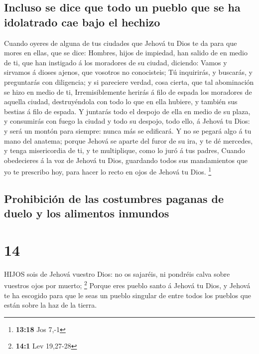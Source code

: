 \hypertarget{incluso-se-dice-que-todo-un-pueblo-que-se-ha-idolatrado-cae-bajo-el-hechizo}{%
\subsection{Incluso se dice que todo un pueblo que se ha idolatrado cae
bajo el
hechizo}\label{incluso-se-dice-que-todo-un-pueblo-que-se-ha-idolatrado-cae-bajo-el-hechizo}}

 Cuando oyeres de alguna de tus ciudades que Jehová tu Dios
te da para que mores en ellas, que se dice:  Hombres, hijos
de impiedad, han salido de en medio de ti, que han instigado á los
moradores de su ciudad, diciendo: Vamos y sirvamos á dioses ajenos, que
vosotros no conocisteis;  Tú inquirirás, y buscarás, y
preguntarás con diligencia; y si pareciere verdad, cosa cierta, que tal
abominación se hizo en medio de ti,  Irremisiblemente
herirás á filo de espada los moradores de aquella ciudad, destruyéndola
con todo lo que en ella hubiere, y también sus bestias á filo de espada.
 Y juntarás todo el despojo de ella en medio de su plaza, y
consumirás con fuego la ciudad y todo su despojo, todo ello, á Jehová tu
Dios: y será un montón para siempre: nunca más se edificará.
 Y no se pegará algo á tu mano del anatema; porque Jehová
se aparte del furor de su ira, y te dé mercedes, y tenga misericordia de
ti, y te multiplique, como lo juró á tus padres,  Cuando
obedecieres á la voz de Jehová tu Dios, guardando todos sus mandamientos
que yo te prescribo hoy, para hacer lo recto en ojos de Jehová tu Dios.
\footnote{\textbf{13:18} Jos 7,-1}

\hypertarget{prohibiciuxf3n-de-las-costumbres-paganas-de-duelo-y-los-alimentos-inmundos}{%
\subsection{Prohibición de las costumbres paganas de duelo y los
alimentos
inmundos}\label{prohibiciuxf3n-de-las-costumbres-paganas-de-duelo-y-los-alimentos-inmundos}}

\hypertarget{section-13}{%
\section{14}\label{section-13}}

 HIJOS sois de Jehová vuestro Dios: no os sajaréis, ni
pondréis calva sobre vuestros ojos por muerto; \footnote{\textbf{14:1}
  Lev 19,27-28}  Porque eres pueblo santo á Jehová tu Dios,
y Jehová te ha escogido para que le seas un pueblo singular de entre
todos los pueblos que están sobre la haz de la tierra.

